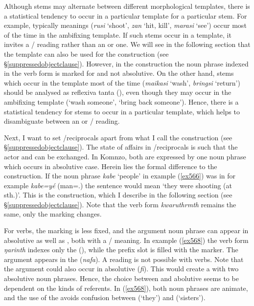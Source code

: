 Although stems may alternate between different morphological templates, there is a statistical tendency to occur in a particular template for a particular stem. For example, typically  meanings (\emph{rusi} `shoot', \emph{zan} `hit, kill', \emph{marasi} `see') occur most of the time in the ambifixing  template. If such stems occur in a  template, it invites a / reading rather than an  or  one. We will see in the following section that the  template can also be used for the  construction (see \S{}\ref{suppressedobjectclause}). However, in the  construction the noun phrase indexed in the verb form is marked for   and not absolutive. On the other hand, stems which occur in the  template most of the time (\emph{maikasi} `wash', \emph{bringsi} `return') should be analysed as reflexiva tanta (\citealt{Geniusienie:1987refl}), even though they may occur in the ambifixing  template (`wash someone', `bring back someone'). Hence, there is a statistical tendency for stems to occur in a particular template, which helps to disambiguate between an  or / reading.%

Next, I want to set /reciprocals apart from what I call the  construction (see \S{}\ref{suppressedobjectclause}). The state of affairs in /reciprocals is such that the actor and  can be exchanged. In Komnzo, both are expressed by one noun phrase which occurs in absolutive case. Herein lies the formal difference to the  construction. If the noun phrase \emph{kabe} `people' in example (\ref{ex566}) was in   \textendash{} for example \emph{kabe=yé} (man=\Erg.\Nsg{}) \textendash{} the sentence would mean `they were shooting (at sth.)'. This is the  construction, which I describe in the following section (see \S{}\ref{suppressedobjectclause}). Note that the verb form \emph{kwaruthrmth} remains the same, only the  marking changes.%

For  verbs, the  marking is less fixed, and the argument noun phrase can appear in absolutive as well as  , both with a / meaning. In example (\ref{ex568}) the verb form \emph{ŋarinth} indexes only the  (\Stdu), while the prefix slot is filled with the  marker. The  argument appears in the  (\emph{nafa}). A  reading is not possible with  verbs. Note that the argument could also occur in absolutive  (\emph{fi}). This would create a  with two absolutive noun phrases. Hence, the choice between  and abolutive seems to be dependent on the kinds of referents. In (\ref{ex568}), both noun phrases are animate, and the use of the   avoids confusion between  (`they') and  (`sisters').

